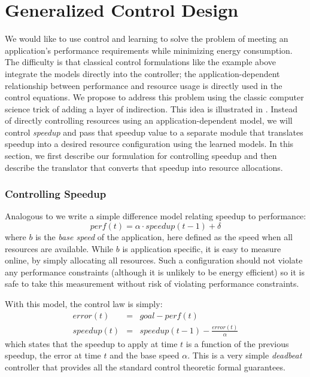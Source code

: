 \section{Generalized Control Design}
We would like to use control and learning to solve the problem of
meeting an application's performance requirements while minimizing
energy consumption.  The difficulty is that classical control
formulations like the example above integrate the models directly into
the controller; \ie the application-dependent relationship between
performance and resource usage is directly used in the control
equations.  We propose to address this problem using the classic
computer science trick of adding a layer of indirection.  This idea is
illustrated in .  Instead of directly controlling
resources using an application-dependent model, we will control
\emph{speedup} and pass that speedup value to a separate module that
translates speedup into a desired resource configuration using the
learned models.  In this section, we first describe our formulation
for controlling speedup and then describe the translator that converts
that speedup into resource allocations.

\subsubsection{Controlling Speedup}
Analogous to  we write a simple difference model
relating speedup to performance:
\begin{equation}
  perf(t) = \alpha \cdot speedup(t-1) + \delta \label{eqn:speedup}
\end{equation}
where $b$ is the \emph{base speed} of the application, here defined as
the speed when all resources are available.  While $b$ is application
specific, it is easy to measure online, by simply allocating all
resources. Such a configuration should not violate any performance
constraints (although it is unlikely to be energy efficient) so it is
safe to take this measurement without risk of violating performance
constraints.

With this model, the control law is simply:
\begin{eqnarray}
  error(t) &=& goal - perf(t) \label{eqn:speedup-error} \\
  speedup(t) &=& speedup(t-1) - \frac{error(t)}{\alpha}
  \label{eqn:speedup-control}
\end{eqnarray}
which states that the speedup to apply at time $t$ is a function of
the previous speedup, the error at time $t$ and the base speed $\alpha$.
This is a very simple \emph{deadbeat}  controller that provides
all the standard control theoretic formal guarantees.  

